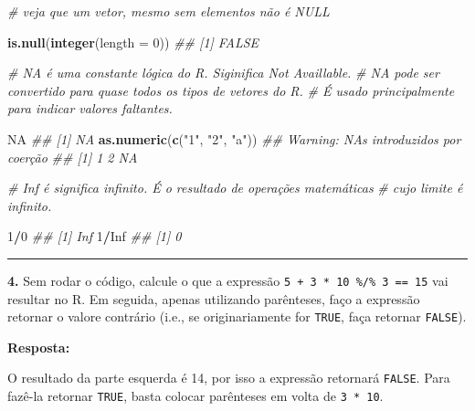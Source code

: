 \documentclass[]{book}
\newenvironment{Shaded}{\begin{snugshade}}{\end{snugshade}}
\newcommand{\CommentTok}[1]{\textcolor[rgb]{0.56,0.35,0.01}{\textit{#1}}}
\newcommand{\DataTypeTok}[1]{\textcolor[rgb]{0.13,0.29,0.53}{#1}}
\newcommand{\DecValTok}[1]{\textcolor[rgb]{0.00,0.00,0.81}{#1}}
\newcommand{\KeywordTok}[1]{\textcolor[rgb]{0.13,0.29,0.53}{\textbf{#1}}}
\newcommand{\NormalTok}[1]{#1}
\newcommand{\OperatorTok}[1]{\textcolor[rgb]{0.81,0.36,0.00}{\textbf{#1}}}
\newcommand{\OtherTok}[1]{\textcolor[rgb]{0.56,0.35,0.01}{#1}}
\newcommand{\StringTok}[1]{\textcolor[rgb]{0.31,0.60,0.02}{#1}}
\begin{document}
\begin{Shaded}
\begin{Highlighting}[]
\CommentTok{# veja que um vetor, mesmo sem elementos não é NULL}

\KeywordTok{is.null}\NormalTok{(}\KeywordTok{integer}\NormalTok{(}\DataTypeTok{length =} \DecValTok{0}\NormalTok{)) }
\CommentTok{## [1] FALSE}

\CommentTok{# NA é uma constante lógica do R. Siginifica Not Availlable. }
\CommentTok{# NA pode ser convertido para quase todos os tipos de vetores do R. }
\CommentTok{# É usado principalmente para indicar valores faltantes.}

\OtherTok{NA}
\CommentTok{## [1] NA}
\KeywordTok{as.numeric}\NormalTok{(}\KeywordTok{c}\NormalTok{(}\StringTok{"1"}\NormalTok{, }\StringTok{"2"}\NormalTok{, }\StringTok{"a"}\NormalTok{))}
\CommentTok{## Warning: NAs introduzidos por coerção}
\CommentTok{## [1]  1  2 NA}

\CommentTok{# Inf é significa infinito. É o resultado de operações matemáticas }
\CommentTok{# cujo limite é infinito.}

\DecValTok{1}\OperatorTok{/}\DecValTok{0}
\CommentTok{## [1] Inf}
\DecValTok{1}\OperatorTok{/}\OtherTok{Inf}
\CommentTok{## [1] 0}
\end{Highlighting}
\end{Shaded}

\begin{center}\rule{0.5\linewidth}{0.5pt}\end{center}

\textbf{4.} Sem rodar o código, calcule o que a expressão \texttt{5\ +\ 3\ *\ 10\ \%/\%\ 3\ ==\ 15} vai resultar no R. Em seguida, apenas utilizando parênteses, faço a expressão retornar o valore contrário (i.e., se originariamente for \texttt{TRUE}, faça retornar \texttt{FALSE}).

\textbf{Resposta:}

O resultado da parte esquerda é 14, por isso a expressão retornará \texttt{FALSE}. Para fazê-la retornar \texttt{TRUE}, basta colocar parênteses em volta de \texttt{3\ *\ 10}.

\begin{Shaded}
\end{Shaded}
\end{document}
